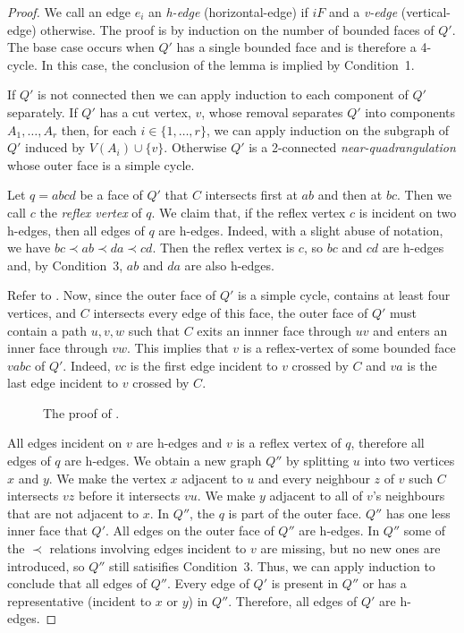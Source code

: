 \documentclass{patmorin}
\begin{document}
\begin{proof}
   We call an edge $e_i$ an \emph{h-edge} (horizontal-edge) if $i
   F$ and a \emph{v-edge} (vertical-edge) otherwise.  The proof is
   by induction on the number of bounded faces of $Q'$.  The base case
   occurs when $Q'$ has a single bounded face and is therefore a 4-cycle.
   In this case, the conclusion of the lemma is implied by Condition~1.

   If $Q'$ is not connected then we can apply induction to each component
   of $Q'$ separately. If $Q'$ has a cut vertex, $v$, whose removal
   separates $Q'$ into components $A_1,\ldots,A_r$ then, for each
   $i\in\{1,\ldots,r\}$, we can apply induction on the subgraph of $Q'$
   induced by $V(A_i)\cup\{v\}$.  
   Otherwise $Q'$ is a 2-connected \emph{near-quadrangulation} whose outer face 
   is a simple cycle.

   Let $q=abcd$ be a face of $Q'$ that $C$ intersects first at $ab$
   and then at $bc$.  Then we call $c$ the \emph{reflex vertex} of $q$.
   We claim that, if the reflex vertex $c$ is incident on two h-edges,
   then all edges of $q$ are h-edges. Indeed, with a slight abuse of
   notation, we have $bc \prec ab\prec da\prec cd$.  Then the reflex
   vertex is $c$, so $bc$ and $cd$ are h-edges and, by Condition~3, $ab$
   and $da$ are also h-edges.

   Refer to .
   Now, since the outer face of $Q'$ is a simple cycle, contains at
   least four vertices, and $C$ intersects every edge of this face, the
   outer face of $Q'$ must contain a path $u,v,w$ such that $C$ exits
   an innner face through $uv$ and enters an inner face through $vw$.
   This implies that $v$ is a reflex-vertex of some bounded face $vabc$
   of $Q'$.  Indeed, $vc$ is the first edge incident to $v$ crossed by
   $C$ and $va$ is the last edge incident to $v$ crossed by $C$.

  \begin{figure}
     \caption{The proof of .}
  \end{figure}

   All edges incident on $v$ are h-edges and $v$ is a reflex vertex of
   $q$, therefore all edges of $q$ are h-edges.
   We obtain a new graph $Q''$ by splitting $u$ into two vertices $x$
   and $y$.  We make the vertex $x$ adjacent to $u$ and every neighbour
   $z$ of $v$ such $C$ intersects $vz$ before it intersects $vu$.  We make
   $y$ adjacent to all of $v$'s neighbours that are not adjacent to $x$.
   In $Q''$, the $q$ is part of the outer face.  $Q''$ has one less inner
   face that $Q'$.  All edges on the outer face of $Q''$ are h-edges.
   In $Q''$ some of the $\prec$ relations involving edges incident
   to $v$ are missing, but no new ones are introduced, so $Q''$ still
   satisifies Condition~3.  Thus, we can apply induction to conclude
   that all edges of $Q''$.  Every edge of $Q'$ is present in $Q''$ or
   has a representative (incident to $x$ or $y$) in $Q''$.  Therefore,
   all edges of $Q'$ are h-edges.
\end{proof}
\end{document}
